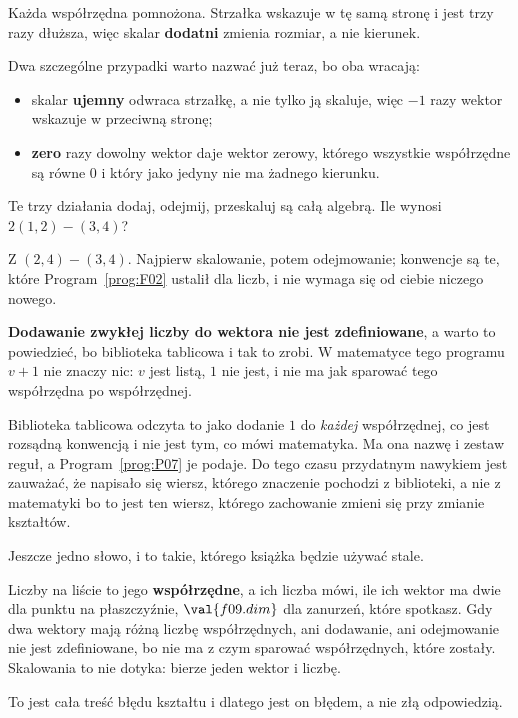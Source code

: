 \begin{fr}
Każda współrzędna pomnożona. Strzałka wskazuje w tę samą stronę i jest trzy
razy dłuższa, więc skalar \textbf{dodatni} zmienia rozmiar, a nie
kierunek.

Dwa szczególne przypadki warto nazwać już teraz, bo oba wracają:

\begin{itemize}
\item skalar \textbf{ujemny} odwraca strzałkę, a nie tylko ją skaluje, więc
  $-1$ razy wektor wskazuje w przeciwną stronę;
\item \textbf{zero} razy dowolny wektor daje wektor zerowy, którego wszystkie
  współrzędne są równe $0$ i który jako jedyny nie ma żadnego kierunku.
\end{itemize}

Te trzy działania \dash{} dodaj, odejmij, przeskaluj \dash{} są całą algebrą.
Ile wynosi $2(1, 2) - (3, 4)$?
\nextframe
\end{fr}

\begin{fr}
Z $(2, 4) - (3, 4)$. Najpierw skalowanie, potem odejmowanie; konwencje są te,
które Program~\ref{prog:F02} ustalił dla liczb, i nie wymaga się od ciebie
niczego nowego.

\begin{trapbox}
\textbf{Dodawanie zwykłej liczby do wektora nie jest zdefiniowane}, a warto
to powiedzieć, bo biblioteka tablicowa i tak to zrobi. W matematyce tego
programu $v + 1$ nie znaczy nic: $v$ jest listą, $1$ nie jest, i nie ma jak
sparować tego współrzędna po współrzędnej.

Biblioteka tablicowa odczyta to jako dodanie $1$ do \emph{każdej}
współrzędnej, co jest rozsądną konwencją i nie jest tym, co mówi matematyka.
Ma ona nazwę i zestaw reguł, a Program~\ref{prog:P07} je podaje. Do tego
czasu przydatnym nawykiem jest zauważać, że napisało się wiersz, którego
znaczenie pochodzi z biblioteki, a nie z matematyki \dash{} bo to jest ten
wiersz, którego zachowanie zmieni się przy zmianie kształtów.
\end{trapbox}

\end{fr}

\begin{fr}
Jeszcze jedno słowo, i to takie, którego książka będzie używać stale.

Liczby na liście to jego \textbf{współrzędne}, a ich liczba mówi, ile ich
wektor ma \dash{} dwie dla punktu na płaszczyźnie, $\val{f09.dim}$ dla
zanurzeń, które spotkasz. Gdy dwa wektory mają różną liczbę współrzędnych,
ani dodawanie, ani odejmowanie nie jest zdefiniowane, bo nie ma z czym
sparować współrzędnych, które zostały. Skalowania to nie dotyka: bierze jeden
wektor i liczbę.

To jest cała treść błędu kształtu i dlatego jest on błędem, a nie złą
odpowiedzią.
\end{fr}


